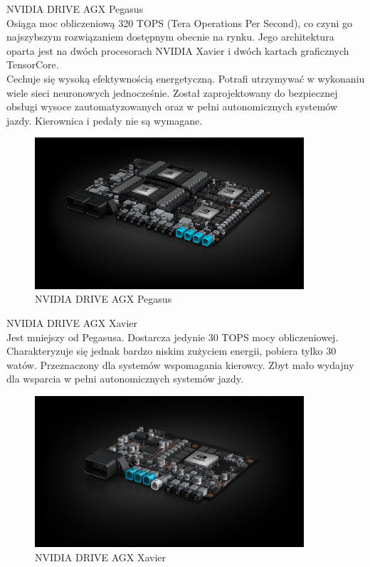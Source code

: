 \begin{enumerate*}
\item NVIDIA DRIVE AGX Pegasus \\
Osiąga moc obliczeniową 320 TOPS (Tera Operations Per Second), co czyni go najszybszym rozwiązaniem dostępnym obecnie na rynku. Jego architektura oparta jest na dwóch procesorach NVIDIA Xavier i dwóch kartach graficznych TensorCore. \\
Cechuje się wysoką efektywnością energetyczną. Potrafi utrzymywać w wykonaniu wiele sieci neuronowych jednocześnie. Został zaprojektowany do bezpiecznej obsługi wysoce zautomatyzowanych oraz w pełni autonomicznych systemów jazdy. Kierownica i pedały nie są wymagane.
\vspace{0.3cm}
\begin{figure}[H]
\centering
\includegraphics[width=10cm]{resources/figures/nv-drive-pegasus.jpg}
\caption{NVIDIA DRIVE AGX Pegasus}
\label{NvidiaDrivePegasus}
\end{figure}

\item NVIDIA DRIVE AGX Xavier \\
Jest mniejszy od Pegasusa. Dostarcza jedynie 30 TOPS mocy obliczeniowej. Charakteryzuje się jednak bardzo niskim zużyciem energii, pobiera tylko 30 watów. Przeznaczony dla systemów wspomagania kierowcy. Zbyt mało wydajny dla wsparcia w pełni autonomicznych systemów jazdy.
\vspace{0.3cm}
\begin{figure}[H]
\centering
\includegraphics[width=10cm]{resources/figures/nv-drive-xavier.jpg}
\caption{NVIDIA DRIVE AGX Xavier}
\label{NvidiaDriveXavier}
\end{figure}


\end{enumerate*}
